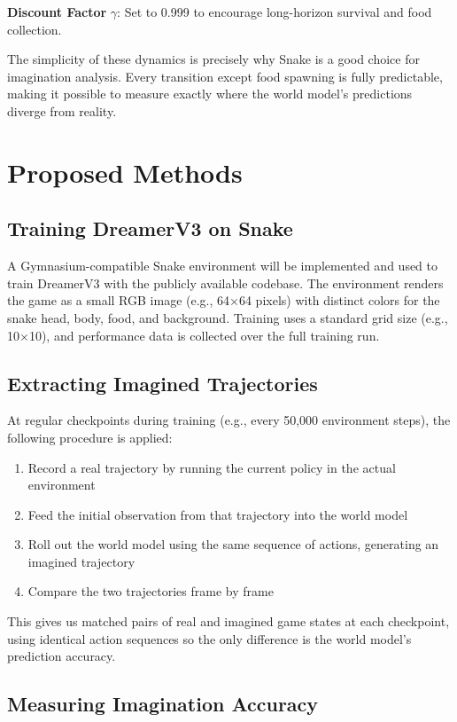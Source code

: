 \documentclass[letterpaper]{article}
\begin{document}
\textbf{Discount Factor} $\gamma$: Set to 0.999 to encourage long-horizon survival and food collection.

The simplicity of these dynamics is precisely why Snake is a good choice for imagination analysis. Every transition except food spawning is fully predictable, making it possible to measure exactly where the world model's predictions diverge from reality.

\section{Proposed Methods}

\subsection{Training DreamerV3 on Snake}

A Gymnasium-compatible Snake environment will be implemented and used to train DreamerV3 with the publicly available codebase. The environment renders the game as a small RGB image (e.g., 64$\times$64 pixels) with distinct colors for the snake head, body, food, and background. Training uses a standard grid size (e.g., 10$\times$10), and performance data is collected over the full training run.

\subsection{Extracting Imagined Trajectories}

At regular checkpoints during training (e.g., every 50,000 environment steps), the following procedure is applied:
\begin{enumerate}
    \item Record a real trajectory by running the current policy in the actual environment
    \item Feed the initial observation from that trajectory into the world model
    \item Roll out the world model using the same sequence of actions, generating an imagined trajectory
    \item Compare the two trajectories frame by frame
\end{enumerate}

This gives us matched pairs of real and imagined game states at each checkpoint, using identical action sequences so the only difference is the world model's prediction accuracy.

\subsection{Measuring Imagination Accuracy}
\end{document}
